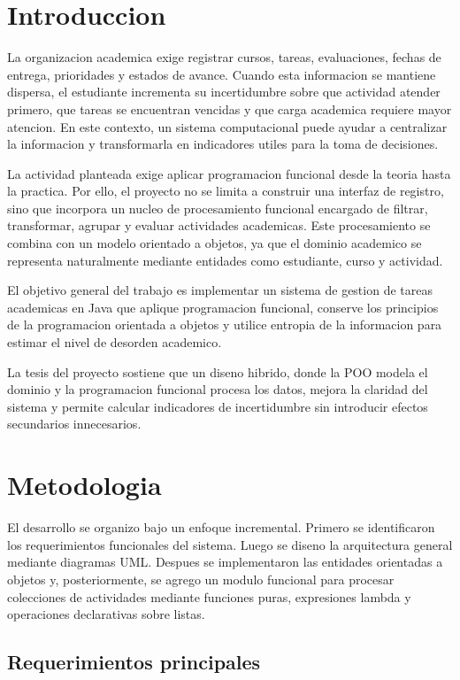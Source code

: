 \documentclass[12pt]{article}
\begin{document}
\section{Introduccion}

La organizacion academica exige registrar cursos, tareas, evaluaciones, fechas de entrega, prioridades y estados de avance. Cuando esta informacion se mantiene dispersa, el estudiante incrementa su incertidumbre sobre que actividad atender primero, que tareas se encuentran vencidas y que carga academica requiere mayor atencion. En este contexto, un sistema computacional puede ayudar a centralizar la informacion y transformarla en indicadores utiles para la toma de decisiones.

La actividad planteada exige aplicar programacion funcional desde la teoria hasta la practica. Por ello, el proyecto no se limita a construir una interfaz de registro, sino que incorpora un nucleo de procesamiento funcional encargado de filtrar, transformar, agrupar y evaluar actividades academicas. Este procesamiento se combina con un modelo orientado a objetos, ya que el dominio academico se representa naturalmente mediante entidades como estudiante, curso y actividad.

El objetivo general del trabajo es implementar un sistema de gestion de tareas academicas en Java que aplique programacion funcional, conserve los principios de la programacion orientada a objetos y utilice entropia de la informacion para estimar el nivel de desorden academico.

La tesis del proyecto sostiene que un diseno hibrido, donde la POO modela el dominio y la programacion funcional procesa los datos, mejora la claridad del sistema y permite calcular indicadores de incertidumbre sin introducir efectos secundarios innecesarios.

\section{Metodologia}

El desarrollo se organizo bajo un enfoque incremental. Primero se identificaron los requerimientos funcionales del sistema. Luego se diseno la arquitectura general mediante diagramas UML. Despues se implementaron las entidades orientadas a objetos y, posteriormente, se agrego un modulo funcional para procesar colecciones de actividades mediante funciones puras, expresiones lambda y operaciones declarativas sobre listas.

\subsection{Requerimientos principales}
\end{document}
